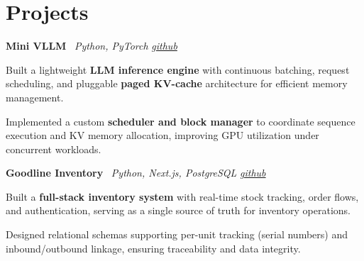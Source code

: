 \section{Projects}

    \hspace{0.5em} \textbf{Mini VLLM} \textbar \  \textit{Python, PyTorch}
\hfill \textit{\href{https://github.com/knarfthekant/mini_vllm}{github}}
    \vspace{0.10 cm}
    \begin{onecolentry}
        \begin{highlights}
            \item Built a lightweight \textbf{LLM inference engine} with continuous batching, request scheduling, and pluggable \textbf{paged KV-cache} architecture for efficient memory management.

            \item Implemented a custom \textbf{scheduler and block manager} to coordinate sequence execution and KV memory allocation, improving GPU utilization under concurrent workloads.

        \end{highlights}
    \end{onecolentry}
    \vspace{0.10 cm}

    \hspace{0.5em} \textbf{Goodline Inventory} \textbar \  \textit{Python, Next.js, PostgreSQL}
\hfill \textit{\href{https://github.com/knarfthekant/goodline_inventory}{github}}
    \vspace{0.10 cm}
    \begin{onecolentry}
        \begin{highlights}
            \item Built a \textbf{full-stack inventory system} with real-time stock tracking, order flows, and authentication, serving as a single source of truth for inventory operations.

            \item Designed relational schemas supporting per-unit tracking (serial numbers) and inbound/outbound linkage, ensuring traceability and data integrity.

        \end{highlights}
    \end{onecolentry}
    \vspace{0.10 cm}

